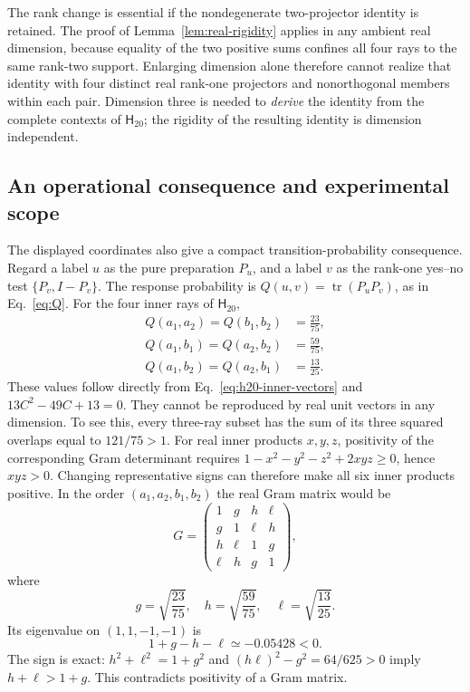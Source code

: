 \documentclass[twocolumn,aps,pra,floatfix,amsmath,amssymb,longbibliography]{revtex4-2}
\theoremstyle{definition}
\theoremstyle{remark}
\newcommand{\Htwenty}{\mathsf H_{20}}
\begin{document}
The rank change is essential if the nondegenerate two-projector identity
is retained.  The proof of Lemma~\ref{lem:real-rigidity} applies in any
ambient real dimension, because equality of the two positive sums confines
all four rays to the same rank-two support.  Enlarging dimension alone
therefore cannot realize that identity with four distinct real rank-one
projectors and nonorthogonal members within each pair.  Dimension three
is needed to \emph{derive} the identity from the complete contexts of
$\Htwenty$; the rigidity of the resulting identity is dimension independent.

\subsection{An operational consequence and experimental scope}

The displayed coordinates also give a compact transition-probability
consequence.  Regard a label $u$ as the pure preparation $P_u$, and a label
$v$ as the rank-one yes--no test $\{P_v,I-P_v\}$.  The response probability
is $Q(u,v)=\operatorname{tr}(P_uP_v)$, as in Eq.~\eqref{eq:Q}.  For the four
inner rays of $\Htwenty$,
\[
 \begin{aligned}
 Q(a_1,a_2)=Q(b_1,b_2)&=\frac{23}{75},\\
 Q(a_1,b_1)=Q(a_2,b_2)&=\frac{59}{75},\\
 Q(a_1,b_2)=Q(a_2,b_1)&=\frac{13}{25}.
 \end{aligned}
\]
These values follow directly from Eq.~\eqref{eq:h20-inner-vectors} and
$13C^2-49C+13=0$.  They cannot be reproduced by real unit vectors in any
dimension.  To see this, every three-ray subset has the sum of its three
squared overlaps equal to $121/75>1$.  For real inner products $x,y,z$,
positivity of the corresponding Gram determinant requires
$1-x^2-y^2-z^2+2xyz\ge0$, hence $xyz>0$.  Changing representative signs
can therefore make all six inner products positive.  In the order
$(a_1,a_2,b_1,b_2)$ the real Gram matrix would be
\[
 G=\begin{pmatrix}
 1&g&h&\ell\\ g&1&\ell&h\\
 h&\ell&1&g\\ \ell&h&g&1
 \end{pmatrix},
\]
where
\[
 g=\sqrt{\frac{23}{75}},\quad
 h=\sqrt{\frac{59}{75}},\quad
 \ell=\sqrt{\frac{13}{25}}.
\]
Its eigenvalue on $(1,1,-1,-1)$ is
\[
 1+g-h-\ell\simeq-0.05428<0.
\]
The sign is exact: $h^2+\ell^2=1+g^2$ and
$(h\ell)^2-g^2=64/625>0$ imply $h+\ell>1+g$.
This contradicts positivity of a Gram matrix.
\end{document}
